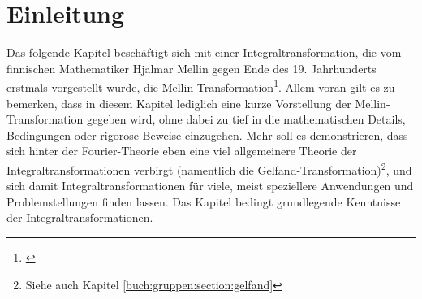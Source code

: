 %
%
%

\section{Einleitung\label{mellin:section:teil0}}

Das folgende Kapitel beschäftigt sich mit einer Integraltransformation, die vom finnischen Mathematiker Hjalmar 
Mellin gegen Ende des 19. Jahrhunderts erstmals vorgestellt wurde, die Mellin-Transformation\footnote{\cite{mellin:mellin-wikipedia}}.
Allem voran gilt es zu bemerken, dass in diesem Kapitel lediglich eine kurze Vorstellung der Mellin-Transformation 
gegeben wird, ohne dabei zu tief in die mathematischen Details, Bedingungen oder rigorose Beweise einzugehen.
Mehr soll es demonstrieren, dass sich hinter der Fourier-Theorie eben eine viel allgemeinere Theorie der Integraltransformationen 
verbirgt (namentlich die Gelfand-Transformation)\footnote{Siehe auch Kapitel \ref{buch:gruppen:section:gelfand}}, und sich damit 
Integraltransformationen für viele, meist speziellere Anwendungen und Problemstellungen finden lassen.
Das Kapitel bedingt grundlegende Kenntnisse der Integraltransformationen.







